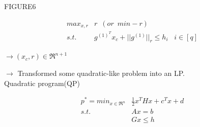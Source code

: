 FIGURE6

\begin{align*}
max_{x, r} &r\,\,\,(or\,\,\,min -r)\\
s.t. &g^{(1)^T}x_c + ||g^{(1)}||_r\leq h_i\,\,\,\,\, i\in [q]
\end{align*}

$\rightarrow(x_c, r)\in \Re^{n+1}$

$\rightarrow$ Transformed some quadratic-like problem into an LP.\\


Quadratic program(QP)

\begin{align*}
p^* = min_{x\in \Re^n} &\frac{1}{2}x^THx + c^Tx + d\\
s.t. \,\,\, &Ax = b\\
&Gx \leq h
\end{align*}




